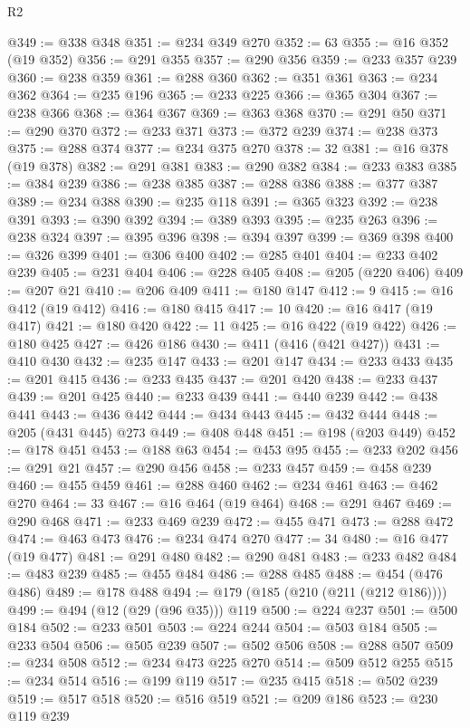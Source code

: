 \begin{lexlean}{R2}
\begin{coremodule}
@349 := @338 @348
@351 := @234 @349 @270
@352 := 63
@355 := @16 @352 (@19 @352)
@356 := @291 @355
@357 := @290 @356
@359 := @233 @357 @239
@360 := @238 @359
@361 := @288 @360
@362 := @351 @361
@363 := @234 @362
@364 := @235 @196
@365 := @233 @225
@366 := @365 @304
@367 := @238 @366
@368 := @364 @367
@369 := @363 @368
@370 := @291 @50
@371 := @290 @370
@372 := @233 @371
@373 := @372 @239
@374 := @238 @373
@375 := @288 @374
@377 := @234 @375 @270
@378 := 32
@381 := @16 @378 (@19 @378)
@382 := @291 @381
@383 := @290 @382
@384 := @233 @383
@385 := @384 @239
@386 := @238 @385
@387 := @288 @386
@388 := @377 @387
@389 := @234 @388
@390 := @235 @118
@391 := @365 @323
@392 := @238 @391
@393 := @390 @392
@394 := @389 @393
@395 := @235 @263
@396 := @238 @324
@397 := @395 @396
@398 := @394 @397
@399 := @369 @398
@400 := @326 @399
@401 := @306 @400
@402 := @285 @401
@404 := @233 @402 @239
@405 := @231 @404
@406 := @228 @405
@408 := @205 (@220 @406)
@409 := @207 @21
@410 := @206 @409
@411 := @180 @147
@412 := 9
@415 := @16 @412 (@19 @412)
@416 := @180 @415
@417 := 10
@420 := @16 @417 (@19 @417)
@421 := @180 @420
@422 := 11
@425 := @16 @422 (@19 @422)
@426 := @180 @425
@427 := @426 @186
@430 := @411 (@416 (@421 @427))
@431 := @410 @430
@432 := @235 @147
@433 := @201 @147
@434 := @233 @433
@435 := @201 @415
@436 := @233 @435
@437 := @201 @420
@438 := @233 @437
@439 := @201 @425
@440 := @233 @439
@441 := @440 @239
@442 := @438 @441
@443 := @436 @442
@444 := @434 @443
@445 := @432 @444
@448 := @205 (@431 @445) @273
@449 := @408 @448
@451 := @198 (@203 @449)
@452 := @178 @451
@453 := @188 @63
@454 := @453 @95
@455 := @233 @202
@456 := @291 @21
@457 := @290 @456
@458 := @233 @457
@459 := @458 @239
@460 := @455 @459
@461 := @288 @460
@462 := @234 @461
@463 := @462 @270
@464 := 33
@467 := @16 @464 (@19 @464)
@468 := @291 @467
@469 := @290 @468
@471 := @233 @469 @239
@472 := @455 @471
@473 := @288 @472
@474 := @463 @473
@476 := @234 @474 @270
@477 := 34
@480 := @16 @477 (@19 @477)
@481 := @291 @480
@482 := @290 @481
@483 := @233 @482
@484 := @483 @239
@485 := @455 @484
@486 := @288 @485
@488 := @454 (@476 @486)
@489 := @178 @488
@494 := @179 (@185 (@210 (@211 (@212 @186))))
@499 := @494 (@12 (@29 (@96 @35))) @119
@500 := @224 @237
@501 := @500 @184
@502 := @233 @501
@503 := @224 @244
@504 := @503 @184
@505 := @233 @504
@506 := @505 @239
@507 := @502 @506
@508 := @288 @507
@509 := @234 @508
@512 := @234 @473 @225 @270
@514 := @509 @512 @255
@515 := @234 @514
@516 := @199 @119
@517 := @235 @415
@518 := @502 @239
@519 := @517 @518
@520 := @516 @519
@521 := @209 @186
@523 := @230 @119 @239

\end{coremodule}
\end{lexlean}
